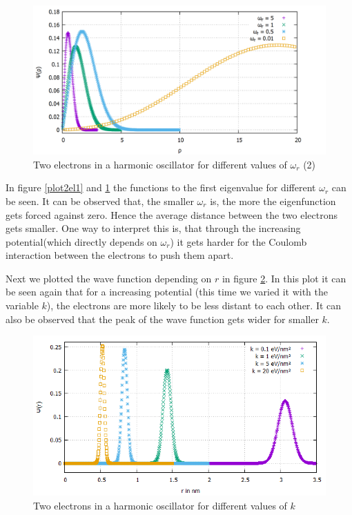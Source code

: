 \documentclass[10pt,a4paper]{article}
\begin{document}
\begin{figure}[h]
	\includegraphics[scale = 0.25]{2Electrons_comparison2_thick.png}
	\centering
	\caption{Two electrons in a harmonic oscillator for different values of $\omega_{r}$ (2) }
	\label{plot2el2}
\end{figure}


In figure \ref{plot2el1} and \ref{plot2el2} the functions to the first eigenvalue for different $\omega_{r}$ can be seen. It can be observed that, the smaller $\omega_{r}$ is, the more the eigenfunction gets forced against zero. Hence the average distance between the two electrons gets smaller. One way to interpret this is, that through the increasing potential(which directly depends on $\omega_{r}$) it gets harder for the Coulomb interaction between the electrons to push them apart.

Next we plotted the wave function depending on $r$ in figure \ref{plot2elr}. In this plot it can be seen again that for a increasing potential (this time we varied it with the variable $k$), the electrons are more likely to be less distant to each other. It can also be observed that the peak of the wave function gets wider for smaller $k$.

\begin{figure}[h]
	\includegraphics[scale = 0.65]{comparison_different_k_thick.png}
	\centering
	\caption{Two electrons in a harmonic oscillator for different values of $k$}
	\label{plot2elr}
\end{figure}
\end{document}
